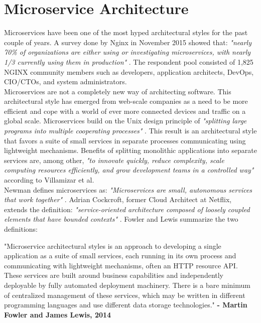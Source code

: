 
\section{Microservice Architecture}
Microservices have been one of the most hyped architectural styles for the past couple of years. A survey done by Nginx in November 2015 showed that: 
\textit{"nearly 70\% of organizations are either using or investigating microservices, with nearly 1/3 currently using them in production"} \cite[p. 6]{nginx2016future}. The respondent pool consisted of 1,825 NGINX community members such as developers, application architects, DevOps, CIO/CTOs, and system administrators. \\

\noindent
Microservices are not a completely new way of architecting software. This architectural style has emerged from web-scale companies as a need to be more efficient and cope with a world of ever more connected devices and traffic on a global scale.  Microservices build on the Unix design principle of \textit{"splitting large programs into multiple cooperating processes"} \cite[p. 188]{raymond2003taoup}. This result is an architectural style that favors a suite of small services in separate processes communicating using lightweight mechanisms. Benefits of splitting monolithic applications into separate services are, among other, \textit{"to innovate quickly, reduce complexity, scale computing resources efficiently, and grow development teams in a controlled way"} \cite[p. 584]{villamizar2015evaluating} according to Villamizar et al. \\

\noindent
Newman defines microservices as:
\textit{"Microservices are small, autonomous services that work together"} \cite[p. 2]{newman2015building}. Adrian Cockcroft, former Cloud Architect at Netflix, extends the definition: \textit{"service-oriented architecture composed of loosely coupled elements that have bounded contexts"} \cite[p. 2]{netflix2015microservices}. Fowler and Lewis summarize the two definitions:

\begin{citat} []
"Microservice architectural styles is an approach to developing a single application as a suite of small services, each running in its own process and communicating with lightweight mechanisms, often an HTTP resource API. These services are built around business capabilities and independently deployable by fully automated deployment machinery. There is a bare minimum of centralized management of these services, which may be written in different programming languages and use different data storage technologies." \textbf{- Martin Fowler and James Lewis, 2014} \cite[p. 2]{lewis2014microservices}
\end{citat}


